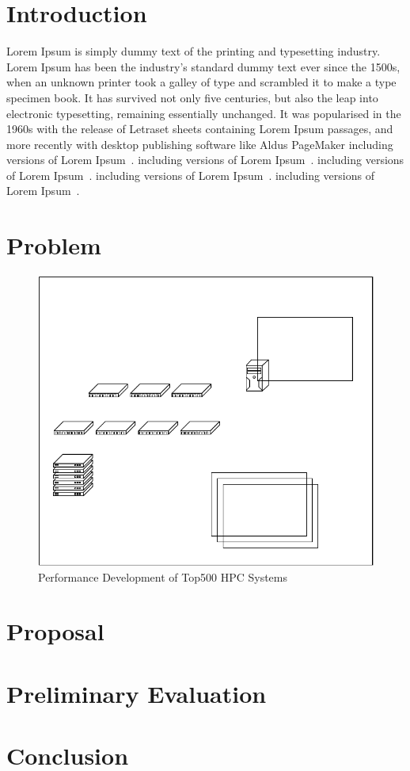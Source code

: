 \documentclass[graybox]{svmult}
\begin{document}
\section{Introduction}

Lorem Ipsum is simply dummy text of the printing and typesetting industry.
Lorem Ipsum has been the industry's standard dummy text ever since the 1500s,
when an unknown printer took a galley of type and scrambled it to make a type
specimen book. It has survived not only five centuries, but also the leap into
electronic typesetting, remaining essentially unchanged. It was popularised in
the 1960s with the release of Letraset sheets containing Lorem Ipsum passages,
and more recently with desktop publishing software like Aldus PageMaker
including versions of Lorem Ipsum~\cite{Takahashi2014}. including versions of
Lorem Ipsum~\cite{Takahashi2015}. including versions of Lorem
Ipsum~\cite{Takahashi2017}. including versions of Lorem
Ipsum~\cite{Takahashi2018}. including versions of Lorem
Ipsum~\cite{Dashdavaa2014}.


\section{Problem}

\begin{figure}
    \centering
    \includegraphics{arch}
    \caption{Performance Development of Top500 HPC Systems}%
    \label{kt:fig:top500-rmax}
\end{figure}

\section{Proposal}

\section{Preliminary Evaluation}

\section{Conclusion}



\end{document}
